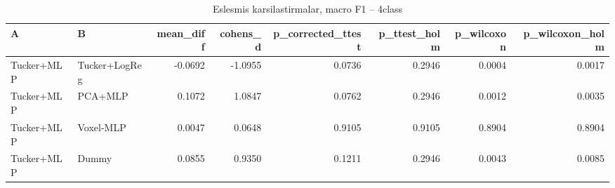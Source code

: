 \begin{table}[htbp]
  \centering
  \caption{Eslesmis karsilastirmalar, macro F1 -- 4class}
  \label{tab:tests_4class}
  \small
  \begin{tabular}{llrrrrrr}
    \toprule
    A & B & mean\_diff & cohens\_d & p\_corrected\_ttest & p\_ttest\_holm & p\_wilcoxon & p\_wilcoxon\_holm \\
    \midrule
    Tucker+MLP & Tucker+LogReg & -0.0692 & -1.0955 & 0.0736 & 0.2946 & 0.0004 & 0.0017 \\
    Tucker+MLP & PCA+MLP & 0.1072 & 1.0847 & 0.0762 & 0.2946 & 0.0012 & 0.0035 \\
    Tucker+MLP & Voxel-MLP & 0.0047 & 0.0648 & 0.9105 & 0.9105 & 0.8904 & 0.8904 \\
    Tucker+MLP & Dummy & 0.0855 & 0.9350 & 0.1211 & 0.2946 & 0.0043 & 0.0085 \\
    \bottomrule
  \end{tabular}
\end{table}
